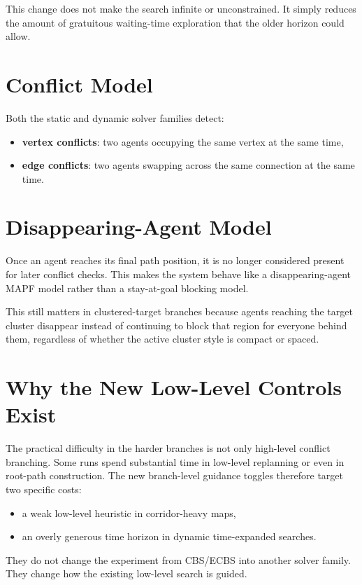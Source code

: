 \documentclass[11pt]{article}
\begin{document}
This change does not make the search infinite or unconstrained. It simply reduces the amount of gratuitous waiting-time exploration that the older horizon could allow.

\section{Conflict Model}

Both the static and dynamic solver families detect:
\begin{itemize}[leftmargin=2em]
    \item \textbf{vertex conflicts}: two agents occupying the same vertex at the same time,
    \item \textbf{edge conflicts}: two agents swapping across the same connection at the same time.
\end{itemize}

\section{Disappearing-Agent Model}

Once an agent reaches its final path position, it is no longer considered present for later conflict checks. This makes the system behave like a disappearing-agent MAPF model rather than a stay-at-goal blocking model.

This still matters in clustered-target branches because agents reaching the target cluster disappear instead of continuing to block that region for everyone behind them, regardless of whether the active cluster style is compact or spaced.

\section{Why the New Low-Level Controls Exist}

The practical difficulty in the harder branches is not only high-level conflict branching. Some runs spend substantial time in low-level replanning or even in root-path construction. The new branch-level guidance toggles therefore target two specific costs:
\begin{itemize}[leftmargin=2em]
    \item a weak low-level heuristic in corridor-heavy maps,
    \item an overly generous time horizon in dynamic time-expanded searches.
\end{itemize}

They do not change the experiment from CBS/ECBS into another solver family. They change how the existing low-level search is guided.
\end{document}

